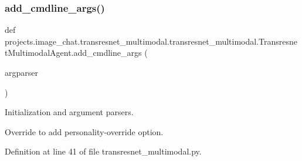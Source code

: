 \subsubsection{\texorpdfstring{add\+\_\+cmdline\+\_\+args()}{add\_cmdline\_args()}}
{\footnotesize\ttfamily def projects.\+image\+\_\+chat.\+transresnet\+\_\+multimodal.\+transresnet\+\_\+multimodal.\+Transresnet\+Multimodal\+Agent.\+add\+\_\+cmdline\+\_\+args (\begin{DoxyParamCaption}\item[{}]{argparser }\end{DoxyParamCaption})\hspace{0.3cm}{\ttfamily [static]}}



Initialization and argument parsers. 

\begin{DoxyVerb}Override to add personality-override option.
\end{DoxyVerb}
 

Definition at line 41 of file transresnet\+\_\+multimodal.\+py.


